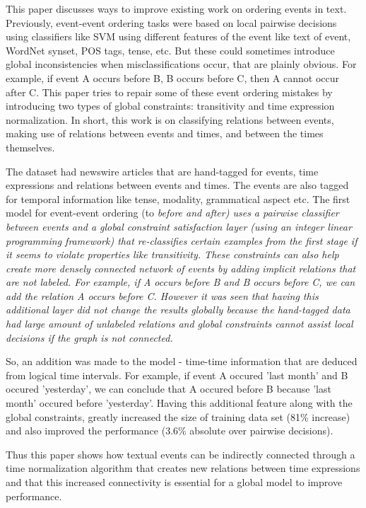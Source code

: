 

This paper discusses ways to improve existing work on ordering events
in text. Previously, event-event ordering tasks were based on local pairwise decisions
using classifiers like SVM using different features of the event like text of event,
WordNet synset, POS tags, tense, etc. But these could sometimes introduce global
inconsistencies when misclassifications occur, that are plainly obvious. For example, if
event A occurs before B, B occurs before C, then A cannot occur after C. This paper tries
to repair some of these event ordering mistakes by introducing two types of global
constraints: transitivity and time expression normalization. In short, this work is on
classifying relations between events, making use of relations between events and times,
and between the times themselves.

The dataset had newswire articles that are hand-tagged for events, time expressions and
relations between events and times. The events are also tagged for temporal information
like tense, modality, grammatical aspect etc. The first model for event-event ordering (to
\em{before} and \em{after}) uses a pairwise classifier between events and a
global constraint satisfaction layer (using an integer linear programming framework) that
re-classifies certain examples from the first stage if it seems to violate properties like
transitivity. These constraints can also help create more densely connected network of
events by adding implicit relations that are not labeled. For example, if A occurs before
B and B occurs before C, we can add the relation A occurs before C. However it was seen
that having this additional layer did not change the results globally because the
hand-tagged data had large amount of unlabeled relations and global constraints cannot
assist local decisions if the graph is not connected.

So, an addition was made to the model - time-time information that are deduced from
logical time intervals. For example, if event A occured 'last month' and B occured
'yesterday', we can conclude that A occured before B because 'last month' occured before
'yesterday'. Having this additional feature along with the global constraints, greatly
increased the size of  training data set (81\% increase) and also improved the performance
(3.6\% absolute over pairwise decisions).

Thus this paper shows how textual events can be indirectly connected through a time
normalization algorithm that creates new relations between time expressions  and that this
increased connectivity is essential for a global model to improve performance.


